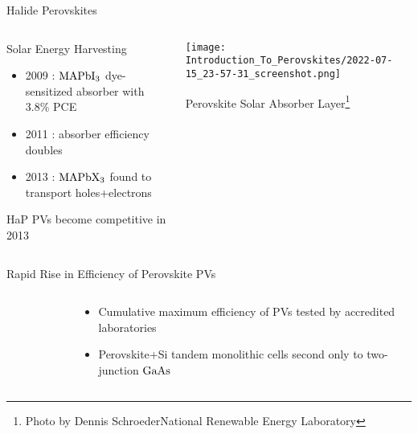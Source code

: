 \documentclass[10pt, aspectratio=169, presentation]{beamer}
\begin{document}
\begin{frame}[label={sec:org26e740a}]{Halide Perovskites}
\begin{columns}
\begin{column}{0.4\columnwidth}
\begin{block}{Solar Energy Harvesting}
\begin{itemize}
\item 2009 : \(\ce{MAPbI_3}\) dye-sensitized absorber with 3.8\% PCE
\autocite{kojima-2009-organ-halid}
\item 2011 : absorber efficiency doubles
\autocite{im-2011}
\item 2013 : \(\ce{MAPbX_3}\) found to transport holes+electrons
\autocite{saliba-2014-influen-therm}
\end{itemize}

HaP PVs become competitive in 2013
\end{block}
\end{column}
\begin{column}{0.6\columnwidth}
\begin{center}
\texttt{[image: Introduction\_To\_Perovskites/2022-07-15\_23-57-31\_screenshot.png]}
\end{center}
Perovskite Solar Absorber Layer\footnote{\tiny{}Photo by Dennis Schroeder\newline{}National Renewable Energy Laboratory}
\end{column}
\end{columns}
\end{frame}
\begin{frame}[label={sec:org673da6f}]{Rapid Rise in Efficiency of Perovskite PVs}
\begin{columns}
\begin{column}{0.6\columnwidth}
 
\begin{figure}[htbp]
\centering

\caption{}
\end{figure}
\end{column}

\begin{column}{0.4\columnwidth}
\begin{itemize}
\item Cumulative maximum efficiency of PVs tested by accredited laboratories\autocite{research-2023-best-resear}
\item Perovskite+Si tandem monolithic cells second only to two-junction \(\ce{GaAs}\)
\end{itemize}
\end{column}
\end{columns}
\end{frame}
\end{document}

